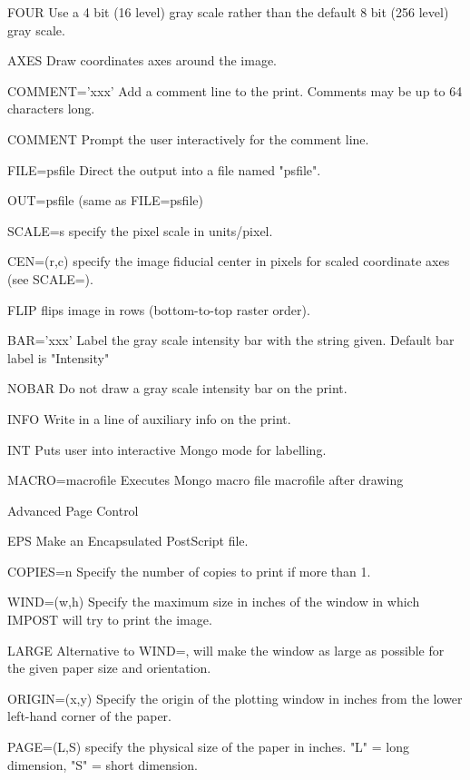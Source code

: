 {\begin{command}
  \item[FOUR ]{Use a 4 bit (16 level) gray scale rather than the
               default 8 bit (256 level) gray scale.}
  \item[AXES ]{Draw coordinates axes around the image.}
  \item[COMMENT='xxx']{Add a comment line to the print.  Comments may be
                       up to 64 characters long. }
  \item[COMMENT ]{Prompt the user interactively for the comment line.}
  \item[FILE=psfile]{Direct the output into a file named "psfile".}
  \item[OUT=psfile]{(same as FILE=psfile)}
  \item[SCALE=s ]{specify the pixel scale in units/pixel.}
  \item[CEN=(r,c)]{specify the image fiducial center in pixels for
                  scaled coordinate axes (see SCALE=).}
  \item[FLIP ]{flips image in rows (bottom-to-top raster order).}
  \item[BAR='xxx' ]{Label the gray scale intensity bar with the string
                    given.  Default bar label is "Intensity"}
  \item[NOBAR ]{Do not draw a gray scale intensity bar on the print.}
  \item[INFO ]{Write in a line of auxiliary info on the print.}
  \item[INT  ]{Puts user into interactive Mongo mode for labelling.}
  \item[MACRO=macrofile]{ Executes Mongo macro file macrofile after drawing}
  \item[Advanced Page Control\hfill]{}
  \item[EPS]{Make an Encapsulated PostScript file.}
  \item[COPIES=n ]{Specify the number of copies to print if more than 1.}
  \item[WIND=(w,h)]{Specify the maximum size in inches of the window in 
                    which IMPOST will try to print the image.}
  \item[LARGE ]{Alternative to WIND=, will make the window as large as 
                possible for the given paper size and orientation.}
  \item[ORIGIN=(x,y)]{Specify the origin of the plotting window in inches 
                      from the lower left-hand corner of the paper.}
  \item[PAGE=(L,S) ]{specify the physical size of the paper in inches.
                     "L" = long dimension, "S" = short dimension.}
\end{command}%
\lthtmlfigureZ
\lthtmlcheckvsize\clearpage}

